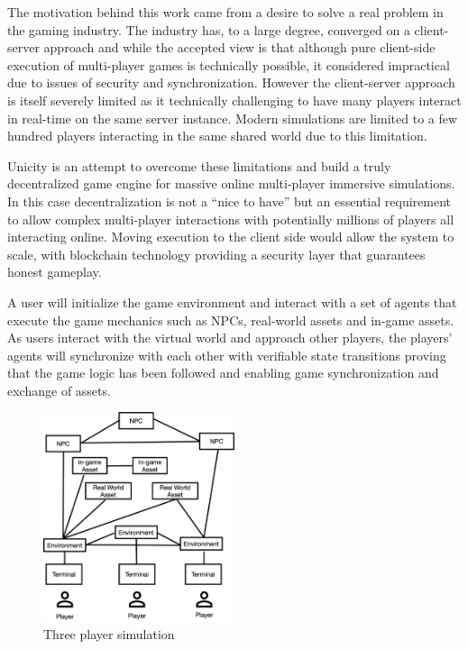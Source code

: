 \documentclass{article}
\begin{document}
\vspace{2mm} 
The motivation behind this work came from a desire to solve a real problem in the gaming industry. The industry has, to a large degree, converged on a client-server approach and while the accepted view is that although pure client-side execution of multi-player games is technically possible, it considered impractical due to issues of security and synchronization. However the client-server approach is itself severely limited as it technically challenging to have many players interact in real-time on the same server instance. Modern simulations are limited to a few hundred players interacting in the same shared world due to this limitation.
\vspace{2mm}

Unicity is an attempt to overcome these limitations and build a truly decentralized game engine for massive online multi-player immersive simulations. In this case decentralization is not a “nice to have” but an essential requirement to allow complex multi-player interactions with potentially millions of players all interacting online. Moving execution to the client side would allow the system to scale, with blockchain technology providing a security layer that guarantees honest gameplay. 

\vspace{2mm}
A user will initialize the game environment and interact with a set of agents that execute the game mechanics such as NPCs, real-world assets and in-game assets. As users interact with the virtual world and approach other players, the players' agents will synchronize with each other with verifiable state transitions proving that the game logic has been followed and enabling game synchronization and exchange of assets.

\begin{figure}[H]
    \centering
    \includegraphics[width=0.5\textwidth]{game.png}
    \caption{Three player simulation}
    \label{fig:game}
\end{figure}
\end{document}

